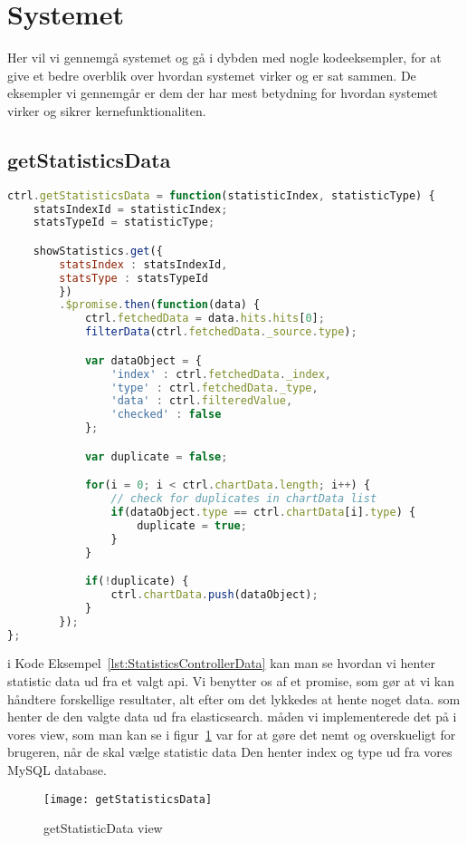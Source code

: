\section{Systemet}
Her vil vi gennemgå systemet og gå i dybden med nogle kodeeksempler, for at give et bedre overblik over hvordan systemet virker og er sat sammen.
De eksempler vi gennemgår er dem der har mest betydning for hvordan systemet virker og sikrer kernefunktionaliten.
\subsection{getStatisticsData}
\begin{lstlisting}[caption={getStatisticsData}, language={JavaScript}, label={lst:StatisticsControllerData}]
ctrl.getStatisticsData = function(statisticIndex, statisticType) {
    statsIndexId = statisticIndex;
    statsTypeId = statisticType;

    showStatistics.get({
        statsIndex : statsIndexId,
        statsType : statsTypeId
        })
        .$promise.then(function(data) {
            ctrl.fetchedData = data.hits.hits[0];
            filterData(ctrl.fetchedData._source.type);

            var dataObject = {
                'index' : ctrl.fetchedData._index,
                'type' : ctrl.fetchedData._type,
                'data' : ctrl.filteredValue,
                'checked' : false
            };

            var duplicate = false;

            for(i = 0; i < ctrl.chartData.length; i++) {
                // check for duplicates in chartData list
                if(dataObject.type == ctrl.chartData[i].type) {
                    duplicate = true;
                }
            }

            if(!duplicate) {
                ctrl.chartData.push(dataObject);
            }
        });
};
\end{lstlisting}
i Kode Eksempel~\ref{lst:StatisticsControllerData} kan man se hvordan vi henter statistic data ud fra et valgt api.
Vi benytter os af et promise, som gør at vi kan håndtere forskellige resultater, alt efter om det lykkedes at hente noget data.
som henter de den valgte data ud fra elasticsearch.
måden vi implementerede det på i vores view, som man kan se i figur~\ref{fig:getStatisticsData} var for at gøre det nemt og overskueligt for brugeren,
når de skal vælge statistic data
Den henter index og type ud fra vores MySQL database.
\begin{figure}[H]
\texttt{[image: getStatisticsData]}
\caption{getStatisticData view}
\label{fig:getStatisticsData}
\end{figure}
